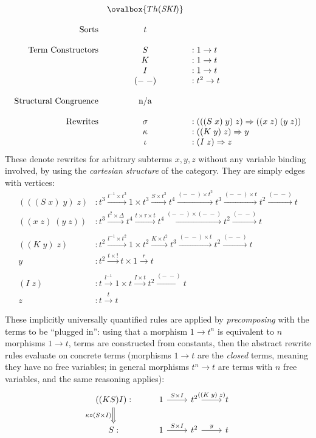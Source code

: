 \documentclass[a4paper,UKenglish]{article}
\theoremstyle{definition}
\begin{document}
\[\begin{array}{rcl}
& \ovalbox{Th(\textit{SKI})} &\\\\
\text{Sorts} & t &\\\\
\text{Term Constructors} & S & :1 \to t\\
& K & :1 \to t\\
& I & :1 \to t\\
& (-\; -) & : t^2 \to t\\\\
\text{Structural Congruence} & \text{n/a} &\\\\
\mathrm{Rewrites} & \sigma & :(((S\; x)\; y)\; z) \Rightarrow ((x\; z)\; (y\; z))\\
& \kappa & :((K\; y)\; z) \Rightarrow y\\
& \iota & :(I\; z) \Rightarrow z\\
\end{array}\]
These denote rewrites for arbitrary subterms $x, y, z$ without any variable binding involved, by using the \textit{cartesian structure} of the category. They are simply edges with vertices:
\[\begin{array}{rl}
(((S\; x)\; y)\; z)&: t^3 \xrightarrow{l^{-1} \times t^3} 1\times t^3 \xrightarrow{S \times t^3} t^4 \xrightarrow{(-\;-)\times t^2} t^3 \xrightarrow{(-\;-) \times t} t^2 \xrightarrow{(-\;-)} t\\
((x\; z)\; (y\; z))&: t^3 \xrightarrow{t^2 \times \Delta} t^4 \xrightarrow{t \times \tau \times t} t^4 \xrightarrow{(-\;-) \times (-\;-)} t^2 \xrightarrow{(-\;-)} t\\\\
((K\; y)\; z)&: t^2 \xrightarrow{l^{-1} \times t^2} 1\times t^2 \xrightarrow{K \times t^2} t^3 \xrightarrow{(-\;-)\times t} t^2 \xrightarrow{(-\;-)} t\\
y&: t^2 \xrightarrow{t \times !} t \times 1 \xrightarrow{r} t\\\\
(I\; z)&: t \xrightarrow{l^{-1}} 1\times t \xrightarrow{I \times t} t^2 \xrightarrow{(-\;-)} t\\
z&: t \xrightarrow{t} t
\end{array}\]

These implicitly universally quantified rules are applied by \textit{precomposing} with the terms to be ``plugged in'': using that a morphism $1 \to t^n$ is equivalent to $n$ morphisms $1 \to t$, terms are constructed from constants, then the abstract rewrite rules evaluate on concrete terms (morphisms $1\to t$ are the \textit{closed} terms, meaning they have no free variables; in general morphisms $t^n\to t$ are terms with $n$ free variables, and the same reasoning applies):
\[\begin{tikzcd}
	((KS)I): \arrow[Rightarrow,d,swap,"\kappa \circ (S\times I)"] & 1 \arrow[r,"S\times I"] & t^2 \arrow[r,"((K\; y)\; z)"] & t\\
	S: & 1 \arrow[r,"S\times I"] & t^2 \arrow[r,"y"] & t
\end{tikzcd}\]\\
\end{document}
